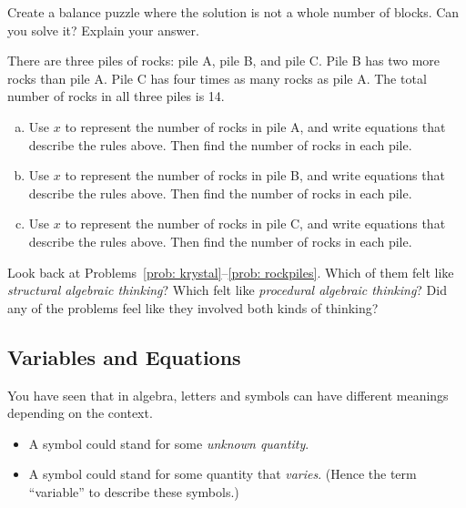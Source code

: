 \begin{problem}
Create a balance puzzle where the solution is not a whole number of blocks.  Can you solve it?  Explain your answer.
\end{problem}



\newpage


\begin{problem}\label{prob: rockpiles}
There are three piles of rocks: pile A, pile B, and pile C.  Pile B has two more rocks than pile A.  Pile C has four times as many rocks as pile A.  The total number of rocks in all three piles is 14.
\begin{enumerate}[(a)]
\item
Use $x$ to represent the number of rocks in pile A, and write equations that describe the rules above.  Then find the number of rocks in each pile.\\
\item
Use $x$ to represent the number of rocks in pile B, and write equations that describe the rules above.  Then find the number of rocks in each pile.\\
\item
Use $x$ to represent the number of rocks in pile C, and write equations that describe the rules above.  Then find the number of rocks in each pile.\\
\end{enumerate}
\end{problem}




\bigskip


\begin{thinkpair*}
Look back at Problems~\ref{prob: krystal}--\ref{prob: rockpiles}.  Which of them felt like \emph{structural algebraic thinking}?  Which felt like \emph{procedural algebraic thinking}?  Did any of the problems feel like they involved both kinds of thinking?

\end{thinkpair*}




\newpage

\subsection{Variables and Equations}
You have seen that in algebra,  letters and symbols  can have different meanings depending on the context.
\begin{itemize}
\item
A symbol could stand for some \emph{unknown quantity}.\\
\item
A symbol could stand for some quantity that \emph{varies}.  (Hence the term ``variable'' to describe these symbols.)\\
\end{itemize}

